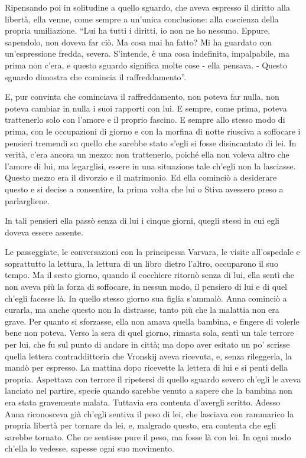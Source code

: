 Ripensando poi in solitudine a quello sguardo, che aveva espresso il diritto alla libertà, ella venne, come sempre a un'unica conclusione: alla coscienza della propria umiliazione. ``Lui ha tutti i diritti, io non ne ho nessuno. Eppure, sapendolo, non doveva far ciò. Ma cosa mai ha fatto? Mi ha guardato con un'espressione fredda, severa. S'intende, è una cosa indefinita, impalpabile, ma prima non c'era, e questo sguardo significa molte cose - ella pensava. - Questo sguardo dimostra che comincia il raffreddamento''. 

E, pur convinta che cominciava il raffreddamento, non poteva far nulla, non poteva cambiar in nulla i suoi rapporti con lui. E sempre, come prima, poteva trattenerlo solo con l'amore e il proprio fascino. E sempre allo stesso modo di prima, con le occupazioni di giorno e con la morfina di notte riusciva a soffocare i pensieri tremendi su quello che sarebbe stato s'egli si fosse disincantato di lei. In verità, c'era ancora un mezzo: non trattenerlo, poiché ella non voleva altro che l'amore di lui, ma legarglisi, essere in una situazione tale ch'egli non la lasciasse. Questo mezzo era il divorzio e il matrimonio. Ed ella cominciò a desiderare questo e si decise a consentire, la prima volta che lui o Stiva avessero preso a parlargliene. 

In tali pensieri ella passò senza di lui i cinque giorni, quegli stessi in cui egli doveva essere assente. 

Le passeggiate, le conversazioni con la principessa Varvara, le visite all'ospedale e soprattutto la lettura, la lettura di un libro dietro l'altro, occuparono il suo tempo. Ma il sesto giorno, quando il cocchiere ritornò senza di lui, ella sentì che non aveva più la forza di soffocare, in nessun modo, il pensiero di lui e di quel ch'egli facesse là. In quello stesso giorno sua figlia s'ammalò. Anna cominciò a curarla, ma anche questo non la distrasse, tanto più che la malattia non era grave. Per quanto si sforzasse, ella non amava quella bambina, e fingere di volerle bene non poteva. Verso la sera di quel giorno, rimasta sola, sentì un tale terrore per lui, che fu sul punto di andare in città; ma dopo aver esitato un po' scrisse quella lettera contraddittoria che Vronskij aveva ricevuta, e, senza rileggerla, la mandò per espresso. La mattina dopo ricevette la lettera di lui e si pentì della propria. Aspettava con terrore il ripetersi di quello sguardo severo ch'egli le aveva lanciato nel partire, specie quando sarebbe venuto a sapere che la bambina non era stata gravemente malata. Tuttavia era contenta d'avergli scritto. Adesso Anna riconosceva già ch'egli sentiva il peso di lei, che lasciava con rammarico la propria libertà per tornare da lei, e, malgrado questo, era contenta che egli sarebbe tornato. Che ne sentisse pure il peso, ma fosse là con lei. In ogni modo ch'ella lo vedesse, sapesse ogni suo movimento. 

